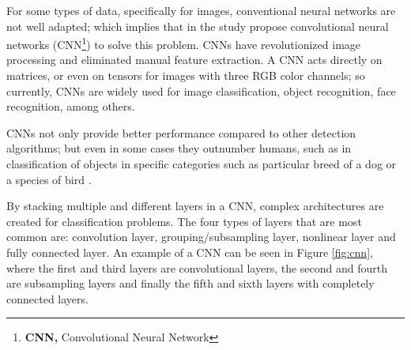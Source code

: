 For some types of data, specifically for images, conventional neural networks are not well adapted; which implies that in the study  propose convolutional neural networks (CNN\footnote{\textbf{CNN,} Convolutional Neural Network}) to solve this problem. CNNs have revolutionized image processing and eliminated manual feature extraction. A CNN acts directly on matrices, or even on tensors for images with three RGB color channels; so currently, CNNs are widely used for image classification, object recognition, face recognition, among others.

\vspace{5mm} %

CNNs not only provide better performance compared to other detection algorithms; but even in some cases they outnumber humans, such as in classification of objects in specific categories such as particular breed of a dog or a species of bird \cite{Reference49}.

\vspace{5mm} %

By stacking multiple and different layers in a CNN, complex architectures are created for classification problems. The four types of layers that are most common are: convolution layer, grouping/subsampling layer, nonlinear layer and fully connected layer. An example of a CNN can be seen in Figure \ref{fig:cnn}, where the first and third layers are convolutional layers, the second and fourth are subsampling layers and finally the fifth and sixth layers with completely connected layers.


